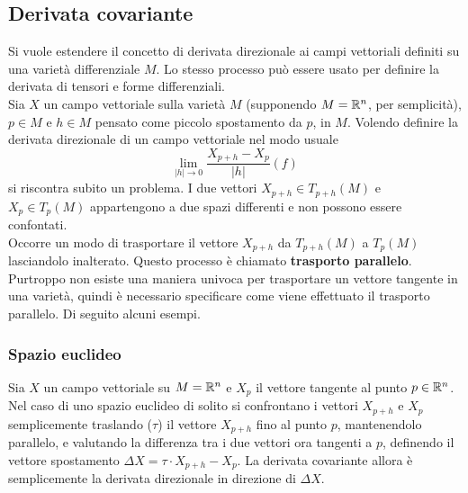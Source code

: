 %

\subsection{Derivata covariante}
Si vuole estendere il concetto di derivata direzionale ai campi vettoriali definiti
su una varietà differenziale $M$. Lo stesso processo può essere usato per definire
la derivata di tensori e forme differenziali.\\

Sia $X$ un campo vettoriale sulla varietà $M$ (supponendo $M = \mathbb{R}^n$,
per semplicità), $p \in M$ e $h \in M$ pensato come piccolo spostamento da $p$, in $M$.
Volendo definire la derivata direzionale di un campo vettoriale nel modo usuale
$$
   \lim_{|h| \to 0} \frac{X_{p+h}-X_p}{|h|}(f)
$$
si riscontra subito un problema. I due vettori $X_{p+h} \in T_{p+h}(M)$ e
$X_p \in T_p(M)$ appartengono a due spazi differenti e non possono essere confontati.\\
Occorre un modo di trasportare il vettore $X_{p+h}$ da $T_{p+h}(M)$ a $T_p(M)$
lasciandolo inalterato. Questo processo è chiamato \textbf{trasporto parallelo}.
Purtroppo non esiste una maniera univoca per trasportare un vettore tangente in
una varietà, quindi è necessario specificare come viene effettuato il trasporto
parallelo. Di seguito alcuni esempi.

\subsubsection{Spazio euclideo}
Sia $X$ un campo vettoriale su $M = \mathbb{R}^n$ e $X_p$ il vettore tangente al punto $p \in \mathbb{R} ^n$.
Nel caso di uno spazio euclideo di solito si confrontano i vettori
$X_{p+h}$ e $X_p$ semplicemente traslando ($\tau$) il vettore $X_{p+h}$ fino al punto $p$,
mantenendolo parallelo, e valutando la differenza tra i due vettori ora tangenti
a $p$, definendo il vettore spostamento $\Delta X = \tau \cdot X_{p+h} - X_p$.
La derivata covariante allora è semplicemente la derivata direzionale in
direzione di $\Delta X$.

